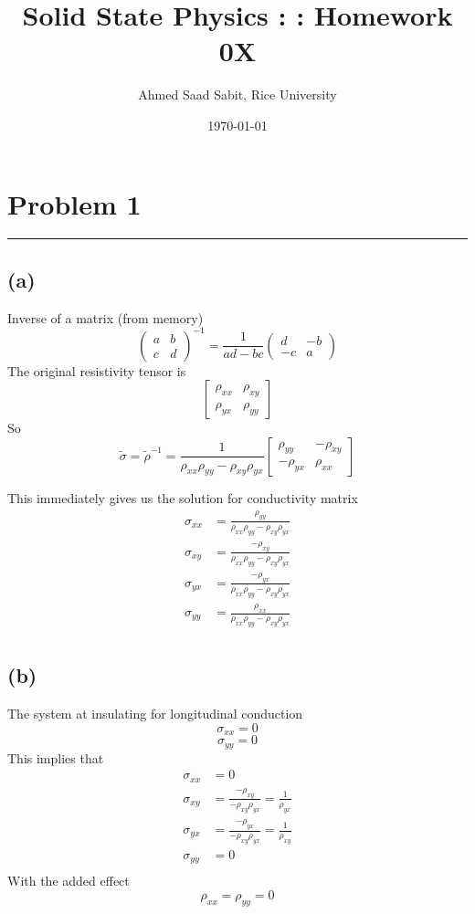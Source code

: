 \documentclass[letter, 10pts]{article}
\title{Solid State Physics : : Homework 0X}
\author{Ahmed Saad Sabit, Rice University}
\date{\today}
\begin{document}
\maketitle

\selectfont

\section*{Problem 1}
\hrule 
\subsection*{(a)} 
Inverse of a matrix (from memory)
\[
	\begin{pmatrix} a & b \\ c & d \end{pmatrix} ^{-1} 
	= 
	\frac{1}{ad - bc} \begin{pmatrix} d  & - b \\ - c & a \end{pmatrix}
\] 
The original resistivity tensor is 
\[
	\begin{bmatrix} \rho_{x x } & \rho_{xy} \\ 
	\rho_{y x} & \rho_{y y} \end{bmatrix} 
\] So 
\[
\tilde \sigma = \tilde \rho^{-1} = 
\frac{1}{\rho_{x x} \rho_{y y} - \rho_{xy} \rho_{yx} }  
\begin{bmatrix} \rho_{y y} & -\rho_{x y} \\ 
-\rho_{y x} & \rho_{x x} \end{bmatrix} 
\]

This immediately gives us the solution for conductivity matrix
\begin{align*}
	\sigma_{x x} &= \frac{\rho_{y y} }{\rho_{x x} \rho_{y y}  - \rho_{x y} \rho_{y x} } \\ 
	\sigma_{x y} &= \frac{- \rho_{x y} }{\rho_{x x} \rho_{y y}  - \rho_{x y} \rho_{y x} } \\ 
	\sigma_{y x} &= \frac{-\rho_{y x} }{\rho_{x x} \rho_{y y}  - \rho_{x y} \rho_{y x} } \\ 
	\sigma_{y y} &= \frac{\rho_{x x} }{\rho_{x x} \rho_{y y}  - \rho_{x y} \rho_{y x} } \\ 
\end{align*}


\subsection*{(b)} 
The system at insulating for longitudinal conduction 
\[
	\sigma_{x x} = 0
\] \[
\sigma_{y y } = 0
\] 
This implies that 
\begin{align*}
	\sigma_{x x} &= 0 \\ 
	\sigma_{x y} &= \frac{- \rho_{x y} }{ - \rho_{x y} \rho_{y x} }  = \frac{1}{\rho_{y x}}\\ 
	\sigma_{y x} &= \frac{-\rho_{y x} }{ - \rho_{x y} \rho_{y x} } = \frac{1}{\rho_{ x y} } \\ 
	\sigma_{y y} &= 0\\ 
\end{align*}
With the added effect 
\[
	\rho_{x x} = \rho_{y y}= 0
\]
\end{document}

